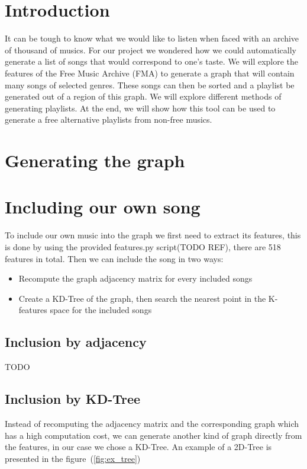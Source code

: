 \section{Introduction}
It can be tough to know what we would like to listen when faced with an archive of thousand of musics. For our project we wondered how we could automatically generate a list of songs that would correspond to one's taste. We will explore the features of the Free Music Archive (FMA) to generate a graph that will contain many songs of selected genres. These songs can then be sorted and a playlist be generated out of a region of this graph. We will explore different methods of generating playlists. At the end, 
we will show how this tool can be used to generate a free alternative playlists from non-free musics.

\section{Generating the graph}


\section{Including our own song}

To include our own music into the graph we first need to extract its features, this is done by using
the provided features.py script(TODO REF), there are 518 features in total.
Then we can include the song in two ways:
\begin{itemize}
\item Recompute the graph adjacency matrix for every included songs
\item Create a KD-Tree of the graph, then search the nearest point in the K-features space for the included songs
\end{itemize}

\subsection{Inclusion by adjacency}
TODO

\subsection{Inclusion by KD-Tree}
Instead of recomputing the adjacency matrix and the corresponding graph which has a high computation cost, we can generate another kind of graph directly from the features, in our case we chose a KD-Tree.
An example of a 2D-Tree is presented in the figure~(\ref{fig:ex_tree})

